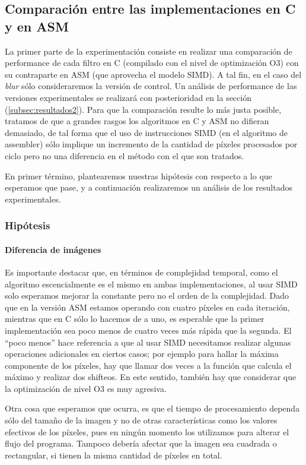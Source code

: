\subsection{Comparación entre las implementaciones en C y en ASM}
La primer parte de la experimentación consiste en realizar una comparación de performance de cada filtro en C (compilado con el nivel de optimización O3) con su contraparte en ASM (que aprovecha el modelo SIMD). A tal fin, en el caso del \emph{blur} sólo consideraremos la versión de control. Un análisis de performance de las versiones experimentales se realizará con posterioridad en la sección (\ref{subsec:resultados2}). Para que la comparación resulte lo más justa posible, tratamos de que a grandes rasgos los algoritmos en C y ASM no difieran demasiado, de tal forma que el uso de instrucciones SIMD (en el algoritmo de assembler) sólo implique un incremento de la cantidad de píxeles procesados por ciclo pero no una diferencia en el método con el que son tratados.

En primer término, plantearemos nuestras hipótesis con respecto a lo que esperamos que pase, y a continuación realizaremos un análisis de los resultados experimentales.

\subsubsection*{Hipótesis}
\paragraph*{Diferencia de imágenes}
Es importante destacar que, en términos de complejidad temporal, como el algoritmo escencialmente es el mismo en ambas implementaciones, al usar SIMD solo esperamos mejorar la constante pero no el orden de la complejidad. Dado que en la versión ASM estamos operando con cuatro píxeles en cada iteración, mientras que en C sólo lo hacemos de a uno, es esperable que la primer implementación sea poco menos de cuatro veces más rápida que la segunda. El ``poco menos''  hace referencia a que al usar SIMD necesitamos realizar algunas operaciones adicionales en ciertos casos; por ejemplo para hallar la máxima componente de los píxeles, hay que llamar dos veces a la función que calcula el máximo y realizar dos shifteos. En este sentido, también hay que considerar que la optimización de nivel O3 es muy agresiva. 

Otra cosa que esperamos que ocurra, es que el tiempo de procesamiento dependa sólo del tamaño de la imagen y no de otras características como los valores efectivos de los píxeles, pues en ningún momento los utilizamos para alterar el flujo del programa. Tampoco debería afectar que la imagen sea cuadrada o rectangular, si tienen la misma cantidad de píxeles en total.


